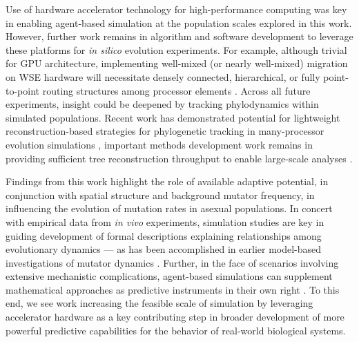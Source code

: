 Use of hardware accelerator technology for high-performance computing was key in enabling agent-based simulation at the population scales explored in this work.
However, further work remains in algorithm and software development to leverage these platforms for \textit{in silico} evolution experiments.
For example, although trivial for GPU architecture, implementing well-mixed (or nearly well-mixed) migration on WSE hardware will necessitate densely connected, hierarchical, or fully point-to-point routing structures among processor elements \citep{james2020physical,luczynski2024near}.
Across all future experiments, insight could be deepened by tracking phylodynamics within simulated populations.
Recent work has demonstrated potential for lightweight reconstruction-based strategies for phylogenetic tracking in many-processor evolution simulations \citep{moreno2022hereditary}, important methods development work remains in providing sufficient tree reconstruction throughput to enable large-scale analyses \citep{moreno2024trackable}.

Findings from this work highlight the role of available adaptive potential, in conjunction with spatial structure and background mutator frequency, in influencing the evolution of mutation rates in asexual populations.
In concert with empirical data from \textit{in vivo} experiments, simulation studies are key in guiding development of formal descriptions explaining relationships among evolutionary dynamics --- as has been accomplished in earlier model-based investigations of mutator dynamics \citep{wylie2009fixation,raynes2018sign}.
Further, in the face of scenarios involving extensive mechanistic complications, agent-based simulations can supplement mathematical approaches as predictive instruments in their own right \citep{an2009agent}.
To this end, we see work increasing the feasible scale of simulation by leveraging accelerator hardware as a key contributing step in broader development of more powerful predictive capabilities for the behavior of real-world biological systems.
